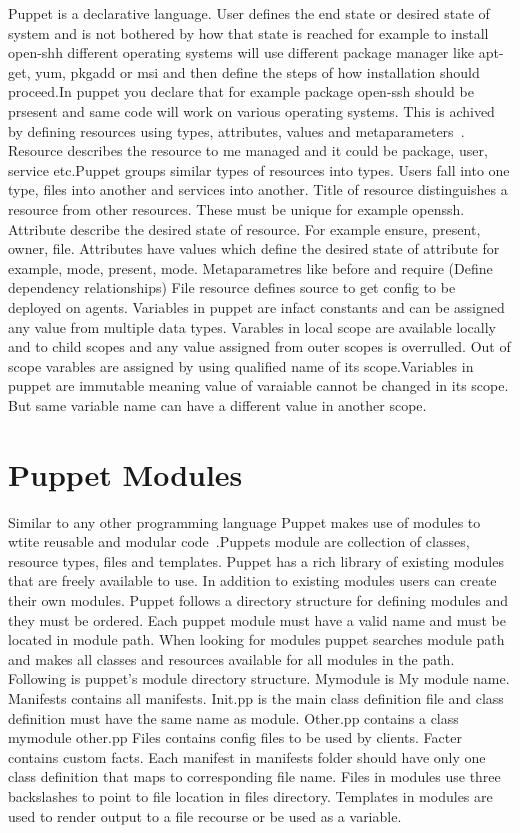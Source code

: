 Puppet is a declarative language. User defines the end state or desired state of
system and is not bothered by how that state is reached for example to install
open-shh different operating systems will use different package manager like
apt-get, yum, pkgadd or msi and then define the steps of how installation should
proceed.In puppet you declare that for example package open-ssh should be
prsesent and same code will work on various operating systems. This is achived
by defining resources using types, attributes, values and metaparameters~\cite{hid-sp18-413-puppet-language}.  Resource describes the resource to
me managed and it could be package, user, service etc.Puppet groups similar
types of resources into types. Users fall into one type, files into another and
services into another. Title of resource
distinguishes a resource from other resources. These must be unique for example openssh.  Attribute
describe the desired state of resource. For example ensure, present, owner,
file.  Attributes have values which define the desired state of attribute for
example, mode, present, mode.  Metaparametres like before and require (Define
dependency relationships) File resource defines source to get config to be
deployed on agents.
Variables in puppet are infact constants and can be assigned any value from
multiple data types. Varables in local scope are available locally and to child
scopes and any value assigned from outer scopes is overrulled. Out of scope
varables are assigned by using qualified name of its scope.Variables in puppet
are immutable meaning value of varaiable cannot be changed in its scope. But
same variable name can have a different value in another scope.


\section{Puppet Modules}

Similar to any other programming language Puppet makes use of modules
to wtite reusable and modular code~\cite{hid-sp18-413-puppet-modules}.Puppets
module are collection of classes, resource types, files and templates. Puppet
has a rich library of existing modules that are freely available to use. In
addition to existing modules users can create their own modules. Puppet follows a directory
structure for defining modules and they must be ordered. Each puppet
module must have a valid name and must be located in module path. When
looking for modules puppet searches module path and makes all
classes and resources available for all modules in the path. Following
is puppet's module directory structure.
Mymodule is My module name.
Manifests contains all manifests.
Init.pp is the main class definition file and class definition  must have the same name as module.
Other.pp contains a class mymodule other.pp
Files contains config files to be used by clients.
Facter contains custom facts.
Each manifest in manifests folder should have only one class definition that maps to corresponding file name.
Files in modules use three backslashes to point to file location in files directory.
Templates in modules are used to render output to a file recourse or be used as a variable.

